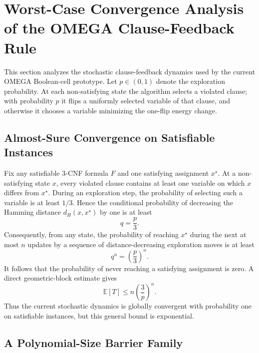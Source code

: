 \section{Worst-Case Convergence Analysis of the OMEGA Clause-Feedback Rule}

This section analyzes the stochastic clause-feedback dynamics used by the
current OMEGA Boolean-cell prototype.  Let $p\in(0,1)$ denote the exploration
probability.  At each non-satisfying state the algorithm selects a violated
clause; with probability $p$ it flips a uniformly selected variable of that
clause, and otherwise it chooses a variable minimizing the one-flip energy
change.

\subsection{Almost-Sure Convergence on Satisfiable Instances}

Fix any satisfiable 3-CNF formula $F$ and one satisfying assignment $x^\star$.
At a non-satisfying state $x$, every violated clause contains at least one
variable on which $x$ differs from $x^\star$.  During an exploration step, the
probability of selecting such a variable is at least $1/3$.  Hence the
conditional probability of decreasing the Hamming distance
$d_H(x,x^\star)$ by one is at least
\begin{equation}
q=\frac{p}{3}.
\end{equation}
Consequently, from any state, the probability of reaching $x^\star$ during the
next at most $n$ updates by a sequence of distance-decreasing exploration
moves is at least
\begin{equation}
q^n=\left(\frac{p}{3}\right)^n.
\end{equation}
It follows that the probability of never reaching a satisfying assignment is
zero.  A direct geometric-block estimate gives
\begin{equation}
\mathbb{E}[T]
\le
n\left(\frac{3}{p}\right)^n.
\end{equation}
Thus the current stochastic dynamics is globally convergent with probability
one on satisfiable instances, but this general bound is exponential.

\subsection{A Polynomial-Size Barrier Family}

